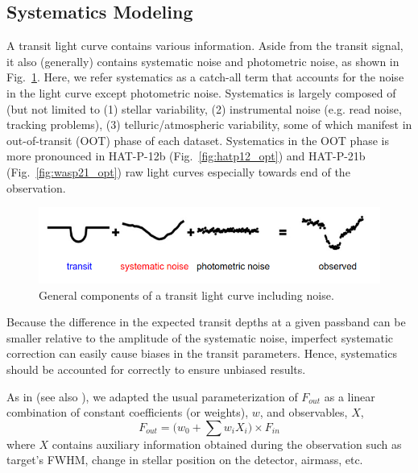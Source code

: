 \subsection{Systematics Modeling}\label{sec:sysmodel}
A transit light curve contains various information. Aside from the transit signal, it also (generally) contains systematic noise and photometric noise, as shown in Fig.~\ref{fig:noise_sources}. Here, we refer systematics as a catch-all term that accounts for the noise in the light curve except photometric noise. Systematics is largely composed of (but not limited to (1) stellar variability, (2) instrumental noise (e.g. read noise, tracking problems), (3) telluric/atmospheric variability, some of which manifest in out-of-transit (OOT) phase of each dataset. Systematics in the OOT phase is more pronounced in HAT-P-12b (Fig.~\ref{fig:hatp12_opt}) and HAT-P-21b (Fig.~\ref{fig:wasp21_opt}) raw light curves especially towards end of the observation.
\begin{figure}
\centering
\includegraphics[width=15cm]{figures/noise.png}
\caption{General components of a transit light curve including noise.}
\label{fig:noise_sources}
\end{figure}
Because the difference in the expected transit depths at a given passband can be smaller relative to the amplitude of the systematic noise, imperfect systematic correction can easily cause biases in the transit parameters. Hence, systematics should be accounted for correctly to ensure unbiased results.%

As in \cite{Fukui2016a} (see also \cite{Luger2017}), we adapted the usual parameterization of $F_{out}$ as a linear combination of  constant coefficients (or weights), $w$, and observables, $X$,
\begin{equation}
F_{out}= \Big(w_0+\sum w_iX_i \Big) \times F_{in}
\end{equation}
where $X$ contains auxiliary information obtained during the observation such as  target's FWHM, change in stellar position on the detector, airmass, etc. 

